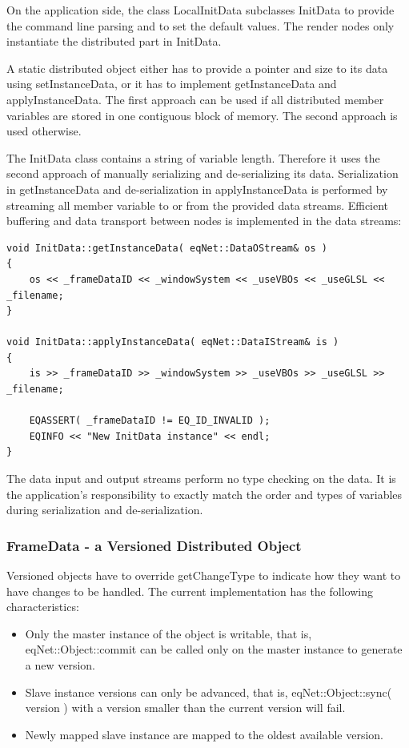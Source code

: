 \documentclass[10pt,a4]{scrartcl}
\begin{document}
On the application side, the class \textsf{LocalInitData} subclasses
\textsf{InitData} to provide the command line parsing and to set the
default values. The render nodes only instantiate the distributed part
in \textsf{InitData}.

A static distributed object either has to provide a pointer and size to
its data using \textsf{setInstanceData}, or it has to implement
\textsf{getInstanceData} and \textsf{applyInstanceData}. The first
approach can be used if all distributed member variables are stored in
one contiguous block of memory. The second approach is used otherwise.

The \textsf{InitData} class contains a string of variable
length. Therefore it uses the second approach of manually serializing
and de-serializing its data. Serialization in \textsf{getInstanceData}
and de-serialization in \textsf{applyInstanceData} is performed by
streaming all member variable to or from the provided data
streams. Efficient buffering and data transport between nodes is
implemented in the data streams:

{\footnotesize\begin{lstlisting}
void InitData::getInstanceData( eqNet::DataOStream& os )
{
    os << _frameDataID << _windowSystem << _useVBOs << _useGLSL << _filename;
}

void InitData::applyInstanceData( eqNet::DataIStream& is )
{
    is >> _frameDataID >> _windowSystem >> _useVBOs >> _useGLSL >> _filename;

    EQASSERT( _frameDataID != EQ_ID_INVALID );
    EQINFO << "New InitData instance" << endl;
}
\end{lstlisting}}%

The data input and output streams perform no type checking on the data.
It is the application's responsibility to exactly match the order and
types of variables during serialization and de-serialization.

\subsubsection{FrameData - a Versioned Distributed Object}

Versioned objects have to override \textsf{getChangeType} to indicate
how they want to have changes to be handled. The current
implementation has the following characteristics:
\begin{itemize}
\item Only the master instance of the object is writable, that is,
  \textsf{eqNet::Object::com\-mit} can be called only on the master
  instance to generate a new version.
\item Slave instance versions can only be advanced, that is,
  \textsf{eqNet::Object::sync( version )} with a version smaller than
  the current version will fail.
\item Newly mapped slave instance are mapped to the oldest available
  version.
\end{itemize}
\end{document}
